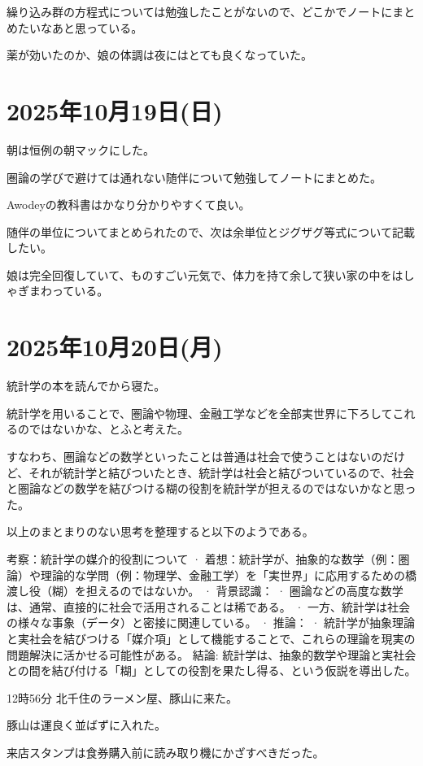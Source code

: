 \documentclass[uplatex]{jsarticle}
\begin{document}
繰り込み群の方程式については勉強したことがないので、どこかでノートにまとめたいなあと思っている。

薬が効いたのか、娘の体調は夜にはとても良くなっていた。

\section{2025年10月19日(日)}

朝は恒例の朝マックにした。

圏論の学びで避けては通れない随伴について勉強してノートにまとめた。

Awodeyの教科書はかなり分かりやすくて良い。

随伴の単位についてまとめられたので、次は余単位とジグザグ等式について記載したい。

娘は完全回復していて、ものすごい元気で、体力を持て余して狭い家の中をはしゃぎまわっている。

\section{2025年10月20日(月)}

統計学の本を読んでから寝た。

統計学を用いることで、圏論や物理、金融工学などを全部実世界に下ろしてこれるのではないかな、とふと考えた。

すなわち、圏論などの数学といったことは普通は社会で使うことはないのだけど、それが統計学と結びついたとき、統計学は社会と結びついているので、社会と圏論などの数学を結びつける糊の役割を統計学が担えるのではないかなと思った。

以上のまとまりのない思考を整理すると以下のようである。

考察：統計学の媒介的役割について
· 着想：統計学が、抽象的な数学（例：圏論）や理論的な学問（例：物理学、金融工学）を「実世界」に応用するための橋渡し役（糊）を担えるのではないか。
· 背景認識：
  · 圏論などの高度な数学は、通常、直接的に社会で活用されることは稀である。
  · 一方、統計学は社会の様々な事象（データ）と密接に関連している。
· 推論：
  · 統計学が抽象理論と実社会を結びつける「媒介項」として機能することで、これらの理論を現実の問題解決に活かせる可能性がある。
結論:
統計学は、抽象的数学や理論と実社会との間を結び付ける「糊」としての役割を果たし得る、という仮説を導出した。

12時56分
北千住のラーメン屋、豚山に来た。

豚山は運良く並ばずに入れた。

来店スタンプは食券購入前に読み取り機にかざすべきだった。
\end{document}
